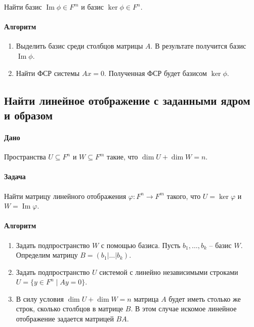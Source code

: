 \documentclass{article}
\renewcommand{\Im}{\operatorname{Im}}
\begin{document}
Найти базис $\Im \phi\in F^{m}$ и базис $\ker \phi\in F^{n}$.

\paragraph{Алгоритм}

\begin{enumerate}
\item Выделить базис среди столбцов матрицы $A$.
В результате получится базис $\Im \phi$.

\item Найти ФСР системы $Ax = 0$.
Полученная ФСР будет базисом $\ker \phi$.
\end{enumerate}

\subsection{Найти линейное отображение с заданными ядром и образом}

\paragraph{Дано}

Пространства $U\subseteq F^n$ и $W \subseteq F^m$ такие, что $\dim U + \dim W = n$.

\paragraph{Задача}

Найти матрицу линейного отображения $\varphi \colon F^n \to F^m$ такого, что $U = \ker \varphi$ и $W = \Im \varphi$.

\paragraph{Алгоритм}

\begin{enumerate}
\item Задать подпространство $W$ с помощью базиса.
Пусть $b_1,\ldots,b_k$ -- базис $W$.
Определим матрицу $B = (b_1 |\ldots |b_k)$.

\item Задать подпространство $U$ системой с линейно независимыми строками $U = \{y\in F^n \mid A y = 0\}$.

\item В силу условия $\dim U + \dim W = n$ матрица $A$ будет иметь столько же строк, сколько столбцов в матрице $B$.
В этом случае искомое линейное отображение задается матрицей $BA$.
\end{enumerate}
\end{document}
